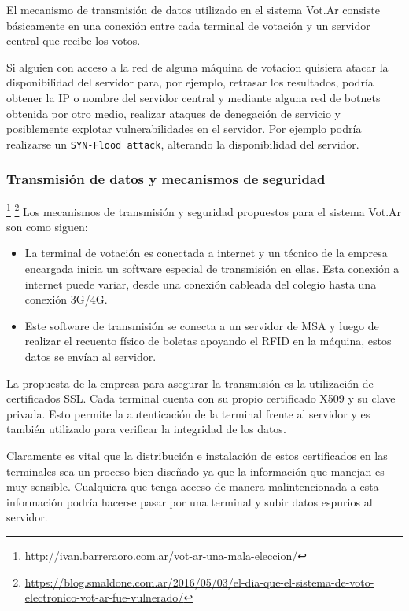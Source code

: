 El mecanismo de transmisión de datos utilizado en el sistema Vot.Ar consiste básicamente en una conexión entre cada terminal de votación y un servidor central que recibe los votos.

Si alguien con acceso a la red de alguna máquina de votacion quisiera atacar la disponibilidad del servidor para, por ejemplo, retrasar los resultados, podría obtener la IP o nombre del servidor central y mediante alguna red de botnets obtenida por otro medio, realizar ataques de denegación de servicio y posiblemente explotar vulnerabilidades en el servidor. Por ejemplo podría realizarse un \texttt{SYN-Flood attack}, alterando la disponibilidad del servidor.


\subsubsection{Transmisión de datos y mecanismos de seguridad}
\footnote{\url{http://ivan.barreraoro.com.ar/vot-ar-una-mala-eleccion/}}
\footnote{\url{https://blog.smaldone.com.ar/2016/05/03/el-dia-que-el-sistema-de-voto-electronico-vot-ar-fue-vulnerado/}}
Los mecanismos de transmisión y seguridad propuestos para el sistema Vot.Ar son como siguen:
\begin{itemize}
	\item La terminal de votación es conectada a internet y un técnico de la empresa encargada inicia un software especial de transmisión en ellas. Esta conexión a internet puede variar, desde una conexión cableada del colegio hasta una conexión 3G/4G.
	\item Este software de transmisión se conecta a un servidor de MSA y luego de realizar el recuento físico de boletas apoyando el RFID en la máquina, estos datos se envían al servidor.
\end{itemize}

La propuesta de la empresa para asegurar la transmisión es la utilización de certificados SSL. Cada terminal cuenta con su propio certificado X509 y su clave privada. Esto permite la autenticación de la terminal frente al servidor y es también utilizado para verificar la integridad de los datos.

Claramente es vital que la distribución e instalación de estos certificados en las terminales sea un proceso bien diseñado ya que la información que manejan es muy sensible. Cualquiera que tenga acceso de manera malintencionada a esta información podría hacerse pasar por una terminal y subir datos espurios al servidor.

